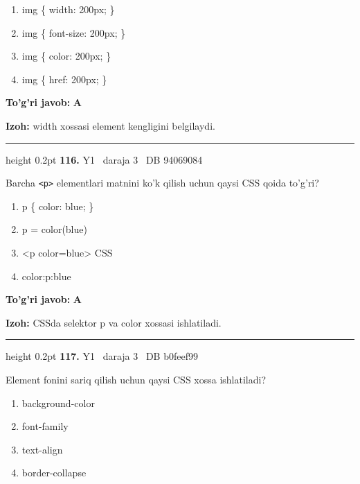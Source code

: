 \documentclass[10pt,a4paper,oneside]{article}
\begin{document}
\begin{enumerate}[label=\Alph*),leftmargin=9mm]
\item img \{ width: 200px; \}
\item img \{ font-size: 200px; \}
\item img \{ color: 200px; \}
\item img \{ href: 200px; \}
\end{enumerate}
\begin{tcolorbox}[enhanced,breakable,colback=teal!4,colframe=teal!45!black,boxrule=0.45pt,arc=1.2mm,left=2.8mm,right=2.8mm,top=2mm,bottom=2mm,before skip=2mm,after skip=2mm]
\textbf{\color{teal}To'g'ri javob:} \textbf{A}
\par\smallskip
\textbf{Izoh:} width xossasi element kengligini belgilaydi.
\end{tcolorbox}
\vspace{2mm}\hrule height 0.2pt \vspace{4mm}
\hypertarget{q116}{\textbf{\color{ink}116.}}  {\color{muted}\scriptsize Y1 \textbullet\ daraja 3 \textbullet\ DB 94069084}
\par
Barcha \texttt{\textless{}p\textgreater{}} elementlari matnini ko'k qilish uchun qaysi CSS qoida to'g'ri?
\begin{enumerate}[label=\Alph*),leftmargin=9mm]
\item p \{ color: blue; \}
\item p = color(blue)
\item \textless{}p color=blue\textgreater{} CSS
\item color:p:blue
\end{enumerate}
\begin{tcolorbox}[enhanced,breakable,colback=teal!4,colframe=teal!45!black,boxrule=0.45pt,arc=1.2mm,left=2.8mm,right=2.8mm,top=2mm,bottom=2mm,before skip=2mm,after skip=2mm]
\textbf{\color{teal}To'g'ri javob:} \textbf{A}
\par\smallskip
\textbf{Izoh:} CSSda selektor p va color xossasi ishlatiladi.
\end{tcolorbox}
\vspace{2mm}\hrule height 0.2pt \vspace{4mm}
\hypertarget{q117}{\textbf{\color{ink}117.}}  {\color{muted}\scriptsize Y1 \textbullet\ daraja 3 \textbullet\ DB b0feef99}
\par
Element fonini sariq qilish uchun qaysi CSS xossa ishlatiladi?
\begin{enumerate}[label=\Alph*),leftmargin=9mm]
\item background-color
\item font-family
\item text-align
\item border-collapse
\end{enumerate}
\end{document}
